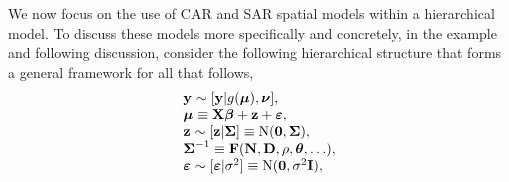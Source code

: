 \documentclass[11pt, titlepage]{article}\usepackage[]{graphicx}\usepackage[]{color}
\begin{document}
\begin{spacing}{1.9}
\begin{flushleft}
We now focus on the use of CAR and SAR spatial models within a hierarchical model. To discuss these models more specifically and concretely, in the example and following discussion, consider the following hierarchical structure that forms a general framework for all that follows,
\begin{equation} \label{eq:HMsetup}
  \begin{array} {l}
    \mathbf{y} \sim [\mathbf{y}|g(\mbox{\boldmath $\mu$}),\mbox{\boldmath $\nu$}], \\
    \mbox{\boldmath $\mu$} \equiv \mathbf{X} \mbox{\boldmath $\beta$} + \mathbf{z}  + \mbox{\boldmath $\varepsilon$}, \\
		\mathbf{z} \sim \textrm{$[\mathbf{z}|\mbox{\boldmath $\Sigma$}]$} \equiv \textrm{N}(\mathbf{0},\mbox{\boldmath $\Sigma$}), \\
    \mbox{\boldmath $\Sigma$}^{-1} \equiv \mathbf{F}(\mathbf{N}, \mathbf{D},\rho,\mbox{\boldmath $\theta$},\ldots), \\
		\mbox{\boldmath $\varepsilon$} \sim \textrm{$[\mbox{\boldmath $\varepsilon$}|\sigma^2]$} \equiv \textrm{N}(\mathbf{0},\sigma^2\mathbf{I}), 
  \end{array}
\end{equation}

\end{flushleft}
\end{spacing}
\end{document}
